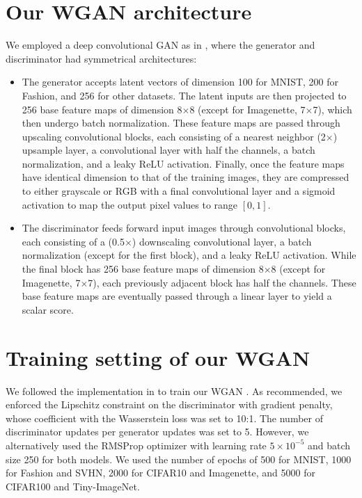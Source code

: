 \section{Our WGAN architecture}
\begin{foldable}
    We employed a deep convolutional GAN as in \cite{radford2015unsupervised}, where the generator and discriminator had symmetrical architectures:
\end{foldable}
\begin{itemize}
    \item The generator accepts latent vectors of dimension 100 for MNIST, 200 for Fashion, and 256 for other datasets. The latent inputs are then projected to 256 base feature maps of dimension 8$\times$8 (except for Imagenette, 7$\times$7), which then undergo batch normalization. These feature maps are passed through upscaling convolutional blocks, each consisting of a nearest neighbor (2$\times$) upsample layer, a convolutional layer with half the channels, a batch normalization, and a leaky ReLU activation. Finally, once the feature maps have identical dimension to that of the training images, they are compressed to either grayscale or RGB with a final convolutional layer and a sigmoid activation to map the output pixel values to range $\left[0,1\right]$.
    \item The discriminator feeds forward input images through convolutional blocks, each consisting of a (0.5$\times$) downscaling convolutional layer, a batch normalization (except for the first block), and a leaky ReLU activation. While the final block has 256 base feature maps of dimension 8$\times$8 (except for Imagenette, 7$\times$7), each previously adjacent block has half the channels. These base feature maps are eventually passed through a linear layer to yield a scalar score.
\end{itemize}


\section{Training setting of our WGAN}
\begin{foldable}
    We followed the implementation in \cite{gulrajani2017improved} to train our WGAN \cite{arjovsky2017wasserstein}.
    As recommended, we enforced the Lipschitz constraint on the discriminator with gradient penalty, whose coefficient with the Wasserstein loss was set to 10:1.
    The number of discriminator updates per generator updates was set to 5.
    However, we alternatively used the RMSProp optimizer with learning rate $5\times10^{-5}$ and batch size 250 for both models.
    We used the number of epochs of 500 for MNIST, 1000 for Fashion and SVHN, 2000 for CIFAR10 and Imagenette, and 5000 for CIFAR100 and Tiny-ImageNet.
\end{foldable}


